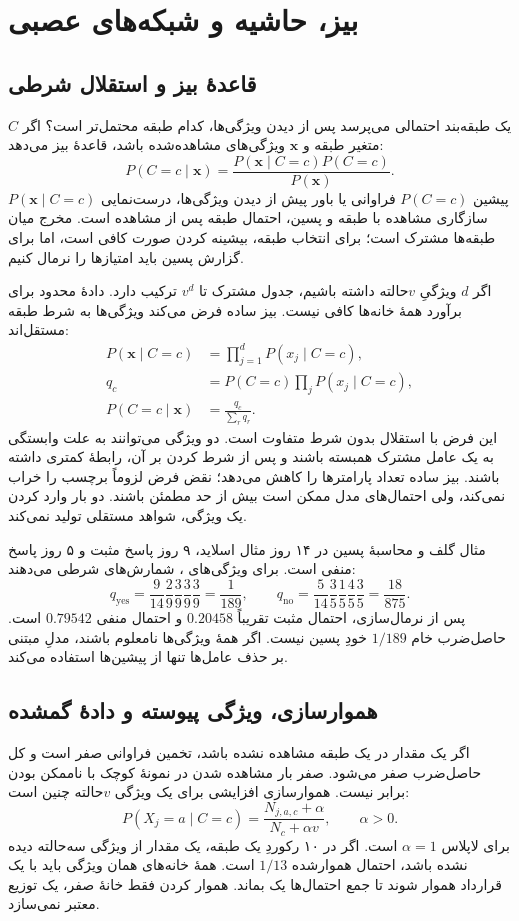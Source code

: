\chapter{بیز، حاشیه و شبکه‌های عصبی}
\section{قاعدهٔ بیز و استقلال شرطی}
یک طبقه‌بند احتمالی می‌پرسد پس از دیدن ویژگی‌ها، کدام طبقه محتمل‌تر است؟ اگر $C$ متغیر طبقه و $\mathbf x$ ویژگی‌های مشاهده‌شده باشد، قاعدهٔ بیز می‌دهد:
\[P(C=c\mid\mathbf x)=\frac{P(\mathbf x\mid C=c)P(C=c)}{P(\mathbf x)}.\]
پیشین $P(C=c)$ فراوانی یا باور پیش از دیدن ویژگی‌ها، درست‌نمایی $P(\mathbf x\mid C=c)$ سازگاری مشاهده با طبقه و پسین، احتمال طبقه پس از مشاهده است. مخرج میان طبقه‌ها مشترک است؛ برای انتخاب طبقه، بیشینه کردن صورت کافی است، اما برای گزارش پسین باید امتیازها را نرمال کنیم.

اگر $d$ ویژگیِ $v$حالته داشته باشیم، جدول مشترک تا $v^d$ ترکیب دارد. دادهٔ محدود برای برآورد همهٔ خانه‌ها کافی نیست. بیز ساده فرض می‌کند ویژگی‌ها به شرط طبقه مستقل‌اند:
\begin{align*}
P(\mathbf x\mid C=c)&=\prod_{j=1}^dP(x_j\mid C=c),\\
q_c&=P(C=c)\prod_jP(x_j\mid C=c),\\
P(C=c\mid\mathbf x)&=\frac{q_c}{\sum_rq_r}.
\end{align*}
این فرض با استقلال بدون شرط متفاوت است. دو ویژگی می‌توانند به علت وابستگی به یک عامل مشترک همبسته باشند و پس از شرط کردن بر آن، رابطهٔ کمتری داشته باشند. بیز ساده تعداد پارامترها را کاهش می‌دهد؛ نقض فرض لزوماً برچسب را خراب نمی‌کند، ولی احتمال‌های مدل ممکن است بیش از حد مطمئن باشند. دو بار وارد کردن یک ویژگی، شواهد مستقلی تولید نمی‌کند.

\begin{example}{مثال گلف و محاسبهٔ پسین}
در ۱۴ روز مثال اسلاید، ۹ روز پاسخ مثبت و ۵ روز پاسخ منفی است. برای ویژگی‌های ، شمارش‌های شرطی می‌دهند:
\[q_{\mathrm{yes}}=\frac9{14}\frac29\frac39\frac39\frac39=\frac1{189},\qquad q_{\mathrm{no}}=\frac5{14}\frac35\frac15\frac45\frac35=\frac{18}{875}.\]
پس از نرمال‌سازی، احتمال مثبت تقریباً $0.20458$ و احتمال منفی $0.79542$ است. حاصل‌ضرب خام $1/189$ خودِ پسین نیست. اگر همهٔ ویژگی‌ها نامعلوم باشند، مدلِ مبتنی بر حذف عامل‌ها تنها از پیشین‌ها استفاده می‌کند.
\end{example}

\section{هموارسازی، ویژگی پیوسته و دادهٔ گمشده}
اگر یک مقدار در یک طبقه مشاهده نشده باشد، تخمین فراوانی صفر است و کل حاصل‌ضرب صفر می‌شود. صفر بار مشاهده شدن در نمونهٔ کوچک با ناممکن بودن برابر نیست. هموارسازی افزایشی برای یک ویژگی $v$حالته چنین است:
\[P(X_j=a\mid C=c)=\frac{N_{j,a,c}+\alpha}{N_c+\alpha v},\qquad\alpha>0.\]
برای لاپلاس $\alpha=1$ است. اگر در ۱۰ رکوردِ یک طبقه، یک مقدار از ویژگی سه‌حالته دیده نشده باشد، احتمال هموارشده $1/13$ است. همهٔ خانه‌های همان ویژگی باید با یک قرارداد هموار شوند تا جمع احتمال‌ها یک بماند. هموار کردن فقط خانهٔ صفر، یک توزیع معتبر نمی‌سازد.

